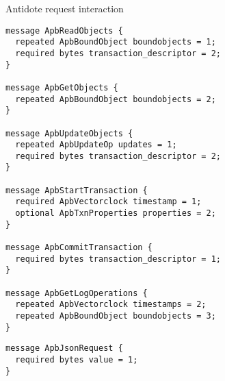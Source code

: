 \begin{algorithm}[H]
\caption{Antidote request interaction}\label{antidote_interaction}
\begin{algorithmic}[1]
    \End
    \End
      \EndIf
    \End
    \End
    \End
  \End
\End
\end{algorithmic}
\end{algorithm}

\begin{lstlisting}[caption={Protocol Buffer interface methods before},label={lst:proto1}]
message ApbReadObjects {
  repeated ApbBoundObject boundobjects = 1;
  required bytes transaction_descriptor = 2;
}

message ApbGetObjects {
  repeated ApbBoundObject boundobjects = 2;
}

message ApbUpdateObjects {
  repeated ApbUpdateOp updates = 1;
  required bytes transaction_descriptor = 2;
}

message ApbStartTransaction {
  required ApbVectorclock timestamp = 1;
  optional ApbTxnProperties properties = 2;
}

message ApbCommitTransaction {
  required bytes transaction_descriptor = 1;
}

message ApbGetLogOperations {
  repeated ApbVectorclock timestamps = 2;
  repeated ApbBoundObject boundobjects = 3;
}
\end{lstlisting}

\begin{lstlisting}[caption={Protocol Buffer interface methods after},label={lst:proto2}]
message ApbJsonRequest {
  required bytes value = 1;
}
\end{lstlisting}

